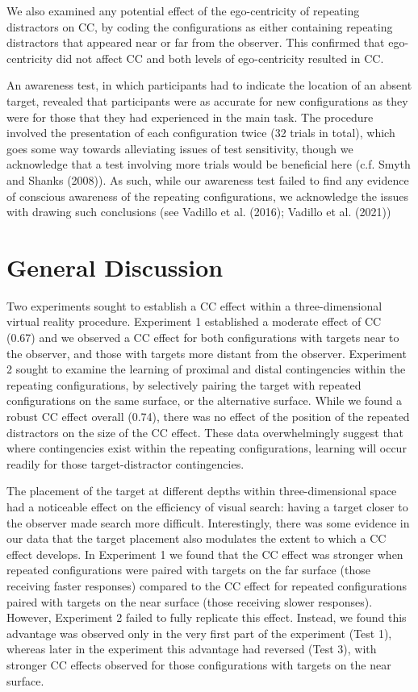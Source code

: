 \documentclass[
  english,
  man,floatsintext]{apa7}
\begin{document}
We also examined any potential effect of the ego-centricity of repeating distractors on CC, by coding the configurations as either containing repeating distractors that appeared near or far from the observer. This confirmed that ego-centricity did not affect CC and both levels of ego-centricity resulted in CC.

An awareness test, in which participants had to indicate the location of an absent target, revealed that participants were as accurate for new configurations as they were for those that they had experienced in the main task. The procedure involved the presentation of each configuration twice (32 trials in total), which goes some way towards alleviating issues of test sensitivity, though we acknowledge that a test involving more trials would be beneficial here (c.f. Smyth and Shanks (2008)). As such, while our awareness test failed to find any evidence of conscious awareness of the repeating configurations, we acknowledge the issues with drawing such conclusions (see Vadillo et al. (2016); Vadillo et al. (2021))

\hypertarget{general-discussion}{%
\section{General Discussion}\label{general-discussion}}

Two experiments sought to establish a CC effect within a three-dimensional virtual reality procedure. Experiment 1 established a moderate effect of CC (0.67) and we observed a CC effect for both configurations with targets near to the observer, and those with targets more distant from the observer. Experiment 2 sought to examine the learning of proximal and distal contingencies within the repeating configurations, by selectively pairing the target with repeated configurations on the same surface, or the alternative surface. While we found a robust CC effect overall (0.74), there was no effect of the position of the repeated distractors on the size of the CC effect. These data overwhelmingly suggest that where contingencies exist within the repeating configurations, learning will occur readily for those target-distractor contingencies.

The placement of the target at different depths within three-dimensional space had a noticeable effect on the efficiency of visual search: having a target closer to the observer made search more difficult. Interestingly, there was some evidence in our data that the target placement also modulates the extent to which a CC effect develops. In Experiment 1 we found that the CC effect was stronger when repeated configurations were paired with targets on the far surface (those receiving faster responses) compared to the CC effect for repeated configurations paired with targets on the near surface (those receiving slower responses). However, Experiment 2 failed to fully replicate this effect. Instead, we found this advantage was observed only in the very first part of the experiment (Test 1), whereas later in the experiment this advantage had reversed (Test 3), with stronger CC effects observed for those configurations with targets on the near surface.
\end{document}

